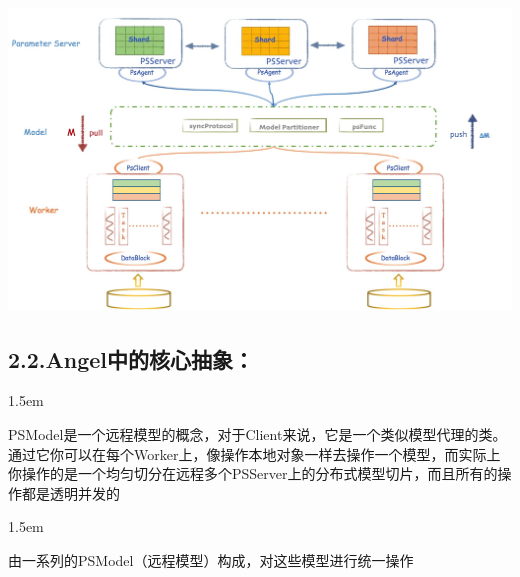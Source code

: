\documentclass{article}
\begin{document}
\noindent{}\includegraphics[keepaspectratio=true,width=\dimmin{}{\dimwidth{0.90}}]{images/angel_architecture_1}{}

\subsection{2.2.\hspace*{0.5em}Angel中的核心抽象：}\label{sec-angel}%

\begin{mddefinitions}%


\begin{mdbmarginx}{}{}{}{1.5em}%
\begin{mddefdata}%
\hspace*{1em}\hspace*{1em}PSModel是一个远程模型的概念，对于Client来说，它是一个类似模型代理的类。通过它你可以在每个Worker上，像操作本地对象一样去操作一个模型，而实际上你操作的是一个均匀切分在远程多个PSServer上的分布式模型切片，而且所有的操作都是透明并发的
\end{mddefdata}%
\end{mdbmarginx}%


\begin{mdbmarginx}{}{}{}{1.5em}%
\begin{mddefdata}%
\hspace*{1em}\hspace*{1em}由一系列的PSModel（远程模型）构成，对这些模型进行统一操作%
\end{mddefdata}%
\end{mdbmarginx}%
\end{mddefinitions}%
\end{document}
